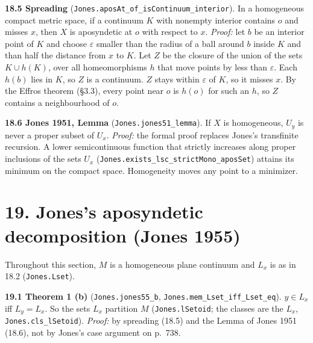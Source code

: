 \documentclass[11pt]{article}
\newcommand{\lean}[1]{\texttt{#1}}
\begin{document}
\textbf{18.5 Spreading} (\lean{Jones.\hspace{0pt}aposAt\_\hspace{0pt}of\_\hspace{0pt}isContinuum\_\hspace{0pt}interior}). In a homogeneous compact metric space, if a continuum $K$ with nonempty interior contains $o$ and misses $x$, then $X$ is aposyndetic at $o$ with respect to $x$. \emph{Proof:} let $b$ be an interior point of $K$ and choose $\varepsilon$ smaller than the radius of a ball around $b$ inside $K$ and than half the distance from $x$ to $K$. Let $Z$ be the closure of the union of the sets $K \cup h(K)$, over all homeomorphisms $h$ that move points by less than $\varepsilon$. Each $h(b)$ lies in $K$, so $Z$ is a continuum. $Z$ stays within $\varepsilon$ of $K$, so it misses $x$. By the Effros theorem (\S{}3.3), every point near $o$ is $h(o)$ for such an $h$, so $Z$ contains a neighbourhood of $o$.

\textbf{18.6 Jones 1951, Lemma} (\lean{Jones.\hspace{0pt}jones51\_\hspace{0pt}lemma}). If $X$ is homogeneous, $U_y$ is never a proper subset of $U_x$. \emph{Proof:} the formal proof replaces Jones's transfinite recursion. A lower semicontinuous function that strictly increases along proper inclusions of the sets $U_x$ (\lean{Jones.\hspace{0pt}exists\_\hspace{0pt}lsc\_\hspace{0pt}strictMono\_\hspace{0pt}aposSet}) attains its minimum on the compact space. Homogeneity moves any point to a minimizer.

\section*{19. Jones's aposyndetic decomposition (Jones 1955)}

Throughout this section, $M$ is a homogeneous plane continuum and $L_x$ is as in 18.2 (\lean{Jones.\hspace{0pt}Lset}).

\textbf{19.1 Theorem 1 (b)} (\lean{Jones.\hspace{0pt}jones55\_\hspace{0pt}b}, \lean{Jones.\hspace{0pt}mem\_\hspace{0pt}Lset\_\hspace{0pt}iff\_\hspace{0pt}Lset\_\hspace{0pt}eq}). $y \in L_x$ iff $L_y = L_x$. So the sets $L_x$ partition $M$ (\lean{Jones.\hspace{0pt}lSetoid}; the classes are the $L_x$, \lean{Jones.\hspace{0pt}cls\_\hspace{0pt}lSetoid}). \emph{Proof:} by spreading (18.5) and the Lemma of Jones 1951 (18.6), not by Jones's case argument on p.~738.
\end{document}
